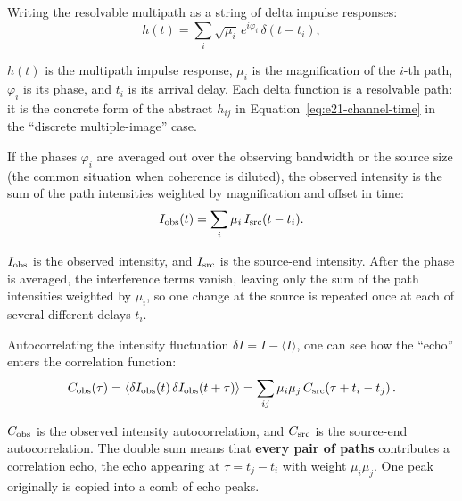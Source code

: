 Writing the resolvable multipath as a string of delta impulse responses:
\begin{equation}
  h(t)=\sum_i \sqrt{\mu_i}\,e^{i\varphi_i}\,\delta(t-t_i),
  \label{eq:e21-multipath-impulse}
\end{equation}
\begin{formulaexplain}
\(h(t)\) is the multipath impulse response, \(\mu_i\) is the magnification of the \(i\)-th path, \(\varphi_i\) is its phase, and \(t_i\) is its arrival delay. Each delta function is a resolvable path: it is the concrete form of the abstract \(h_{ij}\) in Equation~\eqref{eq:e21-channel-time} in the ``discrete multiple-image'' case.
\end{formulaexplain}
If the phases \(\varphi_i\) are averaged out over the observing bandwidth or the source size (the common situation when coherence is diluted), the observed intensity is the sum of the path intensities weighted by magnification and offset in time:
\begin{equation}
  I_{\rm obs}(t)
  =
  \sum_i \mu_i\,I_{\rm src}(t-t_i).
  \label{eq:e21-multipath-intensity}
\end{equation}
\begin{formulaexplain}
\(I_{\rm obs}\) is the observed intensity, and \(I_{\rm src}\) is the source-end intensity. After the phase is averaged, the interference terms vanish, leaving only the sum of the path intensities weighted by \(\mu_i\), so one change at the source is repeated once at each of several different delays \(t_i\).
\end{formulaexplain}
Autocorrelating the intensity fluctuation \(\delta I=I-\langle I\rangle\), one can see how the ``echo'' enters the correlation function:
\begin{equation}
  C_{\rm obs}(\tau)
  =
  \left\langle
  \delta I_{\rm obs}(t)\,
  \delta I_{\rm obs}(t+\tau)
  \right\rangle
  =
  \sum_{ij}\mu_i\mu_j\,
  C_{\rm src}\!\left(\tau+t_i-t_j\right).
  \label{eq:e21-correlation-echo}
\end{equation}
\begin{formulaexplain}
\(C_{\rm obs}\) is the observed intensity autocorrelation, and \(C_{\rm src}\) is the source-end autocorrelation. The double sum means that \textbf{every pair of paths} contributes a correlation echo, the echo appearing at \(\tau=t_j-t_i\) with weight \(\mu_i\mu_j\). One peak originally is copied into a comb of echo peaks.
\end{formulaexplain}
